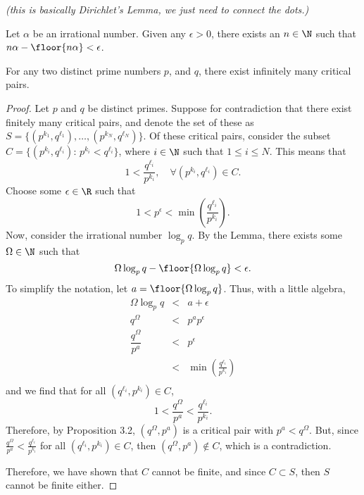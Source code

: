 \documentclass[a5paper]{article}
\begin{document}

\begin{highlight}
\textit{(this is basically Dirichlet's Lemma, we just need to connect the dots.)}
\begin{lemma}
Let $\alpha$ be an irrational number. Given any $\epsilon > 0$, there exists an $n \in \N$ such that $n\alpha-\floor{n\alpha}<\epsilon$.
\end{lemma}
\end{highlight}



\begin{theorem}
For any two distinct prime numbers $p$, and $q$, there exist infinitely many critical pairs. 
\begin{proof}
Let $p$ and $q$ be distinct primes. Suppose for contradiction that there exist finitely many critical pairs, and denote the set of these as $S=\{(p^{k_1}, q^{\ell_1}), \ldots, (p^{k_N}, q^{\ell_N})\}$. Of these critical pairs, consider the subset $C=\{(p^{k_i}, q^{\ell_i}) : \, p^{k_i} < q^{\ell_i}\}$, where $i\in\N$ such that $1\leq i \leq N$. This means that 
$$1 < \frac{q^{\ell_i}}{p^{k_i}}, \quad \forall (p^{k_i}, q^{\ell_i}) \in C.$$
Choose some $\epsilon\in\R$ such that 
$$1<p^\epsilon<\min\left(\frac{q^{\ell_i}}{p^{k_i}}\right).$$
Now, consider the irrational number $\log_pq$. By the Lemma, there exists some $\Omega\in\N$ such that 
$$\Omega\log_pq - \floor{\Omega\log_pq} < \epsilon.$$
To simplify the notation, let $a=\floor{\Omega\log_pq}$. Thus, with a little algebra, 
\[
\begin{array}{rcl}
\Omega\log_pq 	&<&a+\epsilon\\
q^\Omega 		&<& p^{a}p^\epsilon\\
\dfrac{q^\Omega}{p^a}&<&p^\epsilon\\
				&<&\min\left(\frac{q^{\ell_i}}{p^{k_i}}\right)\\
\end{array}
\]
and we find that for all $({q^{\ell_i}},{p^{k_i}})\in C$,
$$1<\dfrac{q^\Omega}{p^a}<\frac{q^{\ell_i}}{p^{k_i}}.$$
Therefore, by Proposition 3.2, $({q^\Omega},{p^a})$ is a critical pair with ${p^a}<{q^\Omega}$. But, since $\frac{q^\Omega}{p^a}<\frac{q^{\ell_i}}{p^{k_i}}$ for all $({q^{\ell_i}},{p^{k_i}})\in C$, then $({q^\Omega},{p^a})\not\in C$, which is a contradiction. 

Therefore, we have shown that $C$ cannot be finite, and since $C\subset S$, then $S$ cannot be finite either. 
\end{proof}
\end{theorem}
\end{document}
